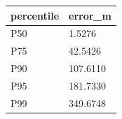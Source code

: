 \begin{tabular}{ll}
\toprule
percentile & error_m \\
\midrule
P50 & 1.5276 \\
P75 & 42.5426 \\
P90 & 107.6110 \\
P95 & 181.7330 \\
P99 & 349.6748 \\
\bottomrule
\end{tabular}

